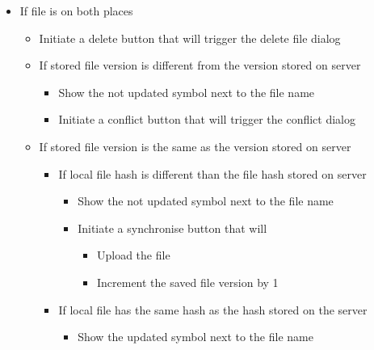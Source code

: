 \documentclass[11pt]{article}
\begin{document}
\begin{itemize}
{\begin{itemize}
{		}
		\item{
		If file is on both places
		\begin{itemize}
			\item{Initiate a delete button that will trigger the delete file dialog}
			\item{
			If stored file version is different from the version stored on server
			\begin{itemize}
				\item{Show the not updated symbol next to the file name}
				\item{Initiate a conflict button that will trigger the conflict dialog}
			\end{itemize}
			}
			\item{
			If stored file version is the same as the version stored on server
			\begin{itemize}
				\item{
				If local file hash is different than the file hash stored on server
				\begin{itemize}
					\item{Show the not updated symbol next to the file name}
					\item{
					Initiate a synchronise button that will
					\begin{itemize}
						\item{Upload the file}
						\item{Increment the saved file version by 1}
					\end{itemize}
					}
				\end{itemize}
				}
				\item{If local file has the same hash as the hash stored on the server
				\begin{itemize}
					\item{Show the updated symbol next to the file name}
				\end{itemize}
				}
			\end{itemize}
			}
		\end{itemize}
		}
	\end{itemize}
	}
\end{itemize}
\end{document}
